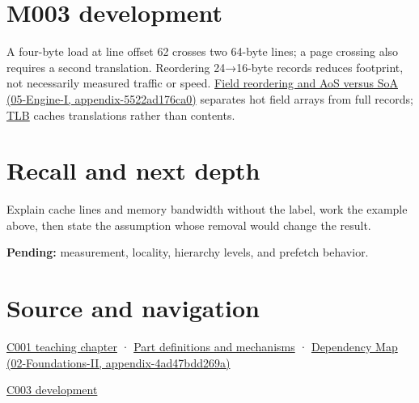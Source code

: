 \section{M003 development}\label{appendix-e4ccdbab8320-m003-development}

A four-byte load at line offset 62 crosses two 64-byte lines; a page crossing also requires a second translation. Reordering 24→16-byte records reduces footprint, not necessarily measured traffic or speed. \href{../05-Engine-I/main.pdf\#nameddest=appendix-5522ad176ca0}{Field reordering and AoS versus SoA (05-Engine-I, appendix-5522ad176ca0)} separates hot field arrays from full records; \hyperref[appendix-7a2d9c5ce511]{TLB} caches translations rather than contents.

\section{Recall and next depth}\label{appendix-e4ccdbab8320-recall-and-next-depth}

Explain cache lines and memory bandwidth without the label, work the example above, then state the assumption whose removal would change the result.

\textbf{Pending:} measurement, locality, hierarchy levels, and prefetch behavior.

\section{Source and navigation}\label{appendix-e4ccdbab8320-source-and-navigation}

\href{Continuous\%20Notes/Computing\%20Foundations\%20-\%20From\%20Bits\%20to\%20C++\%20and\%20Systems\%20APIs\#From\%20a\%20signal\%20to\%20an\%20interpretation}{C001 teaching chapter} · \hyperref[appendix-fd090d982a15]{Part definitions and mechanisms} · \href{../02-Foundations-II/main.pdf\#nameddest=appendix-4ad47bdd269a}{Dependency Map (02-Foundations-II, appendix-4ad47bdd269a)}

\href{Continuous\%20Notes/Computing\%20Foundations\%20-\%20From\%20Bits\%20to\%20C++\%20and\%20Systems\%20APIs\#Where\%20the\%20bytes\%20live}{C003 development}
